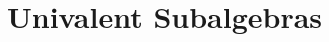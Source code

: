 



\appendix

\section{Univalent Subalgebras}\label{sec:univ-subalg}\firstsentence{\ualibUnivalent}{\urlUnivalent}








